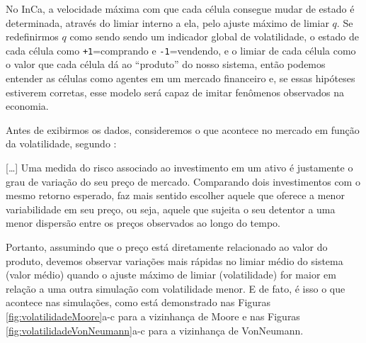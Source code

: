 \documentclass[
	12pt,				%
	openright,			%
	twoside,			%
	a4paper,			%
	english,			%
	french,				%
	spanish,			%
	brazil				%
	]{abntex2}
\begin{document}
No InCa, a velocidade máxima com que cada célula consegue mudar de estado é determinada, através do limiar interno a ela, pelo ajuste máximo de limiar $q$. Se redefinirmos $q$ como sendo sendo um indicador global de volatilidade, o estado de cada célula como \texttt{+1}=comprando e \texttt{-1}=vendendo, e o limiar de cada célula como o valor que cada célula dá ao ``produto'' do nosso sistema, então podemos entender as células como agentes em um mercado financeiro e, se essas hipóteses estiverem corretas, esse modelo será capaz de imitar fenômenos observados na economia.

Antes de exibirmos os dados, consideremos o que acontece no mercado em função da volatilidade, segundo :
\begin{citacao}
 {}[\dots] Uma medida do risco
associado ao investimento em um ativo é justamente o grau de variação do seu preço de
mercado. Comparando dois investimentos com o mesmo retorno esperado, faz mais sentido
escolher aquele que oferece a menor variabilidade em seu preço, ou seja, aquele que sujeita o
seu detentor a uma menor dispersão entre os preços observados ao longo do tempo. \cite{anbima3}
\end{citacao}
Portanto, assumindo que o preço está diretamente relacionado ao valor do produto, devemos observar variações mais rápidas no limiar médio do sistema (valor médio) quando o ajuste máximo de limiar (volatilidade) for maior em relação a uma outra simulação com volatilidade menor. E de fato, é isso o que acontece nas simulações, como está demonstrado nas Figuras \ref{fig:volatilidadeMoore}a-c para a vizinhança de Moore e nas Figuras \ref{fig:volatilidadeVonNeumann}a-c para a vizinhança de VonNeumann.
\end{document}
